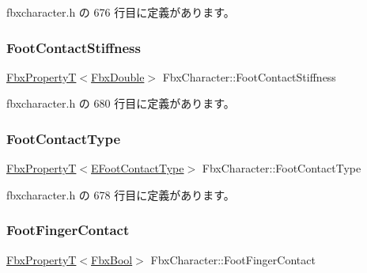  fbxcharacter.\+h の 676 行目に定義があります。

\mbox{\label{class_fbx_character_a428481f5695db1219d6674953a933619}} 
\subsubsection{\texorpdfstring{Foot\+Contact\+Stiffness}{FootContactStiffness}}
{\footnotesize\ttfamily \hyperlink{class_fbx_property_t}{Fbx\+PropertyT}$<$\hyperlink{fbxtypes_8h_a171e72a1c46fc15c1a6c9c31948c1c5b}{Fbx\+Double}$>$ Fbx\+Character\+::\+Foot\+Contact\+Stiffness}



 fbxcharacter.\+h の 680 行目に定義があります。

\mbox{\label{class_fbx_character_a422e7b0fe0418f16fe99d42ccd407cf3}} 
\subsubsection{\texorpdfstring{Foot\+Contact\+Type}{FootContactType}}
{\footnotesize\ttfamily \hyperlink{class_fbx_property_t}{Fbx\+PropertyT}$<$\hyperlink{class_fbx_character_ac8775e4bfaebf2f84b9968a6b7757d8d}{E\+Foot\+Contact\+Type}$>$ Fbx\+Character\+::\+Foot\+Contact\+Type}



 fbxcharacter.\+h の 678 行目に定義があります。

\mbox{\label{class_fbx_character_ad07ec037016f94f19f4f8e1168e67399}} 
\subsubsection{\texorpdfstring{Foot\+Finger\+Contact}{FootFingerContact}}
{\footnotesize\ttfamily \hyperlink{class_fbx_property_t}{Fbx\+PropertyT}$<$\hyperlink{fbxtypes_8h_a92e0562b2fe33e76a242f498b362262e}{Fbx\+Bool}$>$ Fbx\+Character\+::\+Foot\+Finger\+Contact}



